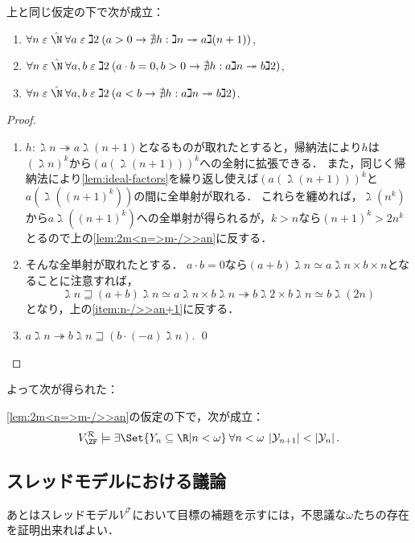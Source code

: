 \documentclass[realisability.tex]{subfiles}
\begin{document}
\begin{corollary}\label{cor:no-surjections-on-ideals}
 上と同じ仮定の下で次が成立：
 \begin{enumerate}
  \item \label{item:n-/>>an+1} $\forall n \strin \hat{\N}\: \forall a \strin \gimel 2\: (a > 0 \to \nexists h: \gimel n \twoheadrightarrow a \gimel (n+1))$,
  \item $\forall n \strin \hat{\N}\: \forall a, b \strin \gimel 2\: (a \cdot b = 0, b > 0 \to \nexists h: a \gimel n \twoheadrightarrow b\gimel 2)$,
  \item $\forall n \strin \hat{\N}\: \forall a, b \strin \gimel 2\: (a < b \to \nexists h: a \gimel n \twoheadrightarrow b\gimel 2)$.
 \end{enumerate}
\end{corollary}
\begin{proof}
 \begin{enumerate}
  \item $h: \gimel n \twoheadrightarrow a \gimel (n+1)$となるものが取れたとすると，帰納法により$h$は$(\gimel n)^k$から$(a(\gimel (n+1)))^{k}$への全射に拡張できる．
        また，同じく帰納法により\cref{lem:ideal-factors}を繰り返し使えば$(a(\gimel(n+1)))^k$と$a(\gimel((n+1)^k))$の間に全単射が取れる．
        これらを纏めれば，$\gimel (n^k)$から$a \gimel ((n+1)^k)$への全単射が得られるが，$k > n$なら$(n+1)^k > 2n^k$とるので上の\cref{lem:2m<n=>m-/>>an}に反する．
  \item そんな全単射が取れたとする．
        $a \cdot b = 0$なら$(a + b)\gimel n \simeq a \gimel n \times b \times n$となることに注意すれば，
        \[
         \gimel n \sqsupseteq (a+b) \gimel n \simeq a \gimel n \times b \gimel n \twoheadrightarrow b \gimel 2 \times b \gimel n \simeq b \gimel (2n)
        \]
        となり，上の\ref{item:n-/>>an+1}に反する．
  \item $a \gimel n \twoheadrightarrow b \gimel n \sqsupseteq (b \cdot (- a)\gimel n)$. \qed
 \end{enumerate}
\end{proof}

よって次が得られた：

\begin{corollary}
 \cref{lem:2m<n=>m-/>>an}の仮定の下で，次が成立：
 \[
  V^{\mathcal{R}}_{\ZF} \models \exists \Set{Y_n \subseteq \R | n < \omega} \: \forall n < \omega \: \left|\mathcal{Y}_{n+1}\right| < \left|\mathcal{Y}_{n}\right|.
 \]
\end{corollary}

\subsection{スレッドモデルにおける議論}
あとはスレッドモデル$V^{\mathcal{T}}$において目標の補題を示すには，不思議な$\omega$たちの存在を証明出来ればよい．
\end{document}
